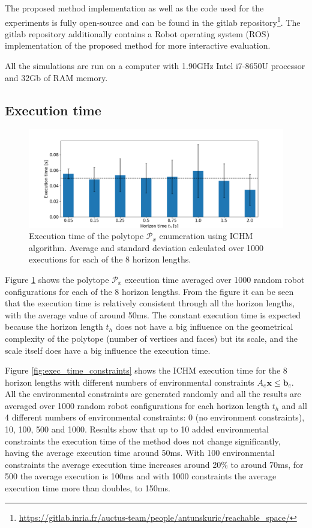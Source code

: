 The proposed method implementation as well as the code used for the experiments is fully open-source and can be found in the gitlab repository\footnote{\url{https://gitlab.inria.fr/auctus-team/people/antunskuric/reachable_space/}}. The gitlab repository additionally contains a Robot operating system (ROS) implementation of the proposed method for more interactive evaluation.

All the simulations are run on a computer with 1.90GHz Intel i7-8650U processor and 32Gb of RAM memory.
 

\subsection{Execution time}

\begin{figure}[!t]
    \centering
    \includegraphics[width=0.7\linewidth]{Papers/images/time.png}
    
    \caption{Execution time of the polytope $\mathcal{P}_x$ enumeration using ICHM algorithm. Average and standard deviation calculated over 1000 executions for each of the 8 horizon lengths.}
    \label{fig:exec_time}

\end{figure}

Figure \ref{fig:exec_time} shows the polytope $\mathcal{P}_x$ execution time averaged over 1000 random robot configurations for each of the 8 horizon lengths. From the figure it can be seen that the execution time is relatively consistent through all the horizon lengths, with the average value of around 50ms. The constant execution time is expected because the horizon length $t_h$ does not have a big influence on the geometrical complexity of the polytope (number of vertices and faces) but its scale, and the scale itself does have a big influence the execution time.


Figure \ref{fig:exec_time_constraints} shows the ICHM execution time for the 8 horizon lengths with different numbers of environmental constraints $A_e\bm{x}\!\leq\!\bm{b}_e$. All the environmental constraints are generated randomly and all the results are averaged over 1000 random robot configurations for each horizon length $t_h$ and all 4 different numbers of environmental constraints: 0 (no environment constraints), 10, 100, 500 and 1000. Results show that up to 10 added environmental constraints the execution time of the method does not change significantly, having the average execution time around 50ms. With 100 environmental constraints the average execution time increases around 20\% to around 70ms, for 500 the average execution is 100ms and with 1000 constraints the average execution time more than doubles, to 150ms.   


